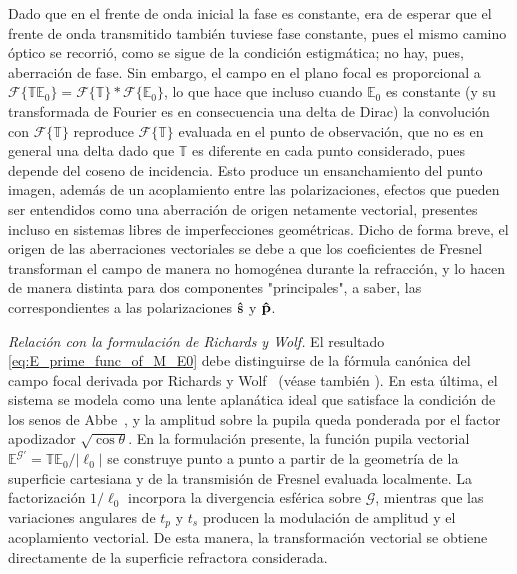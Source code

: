 Dado que en el frente de onda inicial la fase es constante, era de esperar que el frente de onda transmitido también tuviese fase constante, pues el mismo camino óptico se recorrió, como se sigue de la condición estigmática; no hay, pues, aberración de fase. Sin embargo, el campo en el plano focal es proporcional a $\mathscr F\{\mathbb T \mathbb E_0\} = \mathscr F\{\mathbb T\} * \mathscr F\{\mathbb E_0\}$, lo que hace que incluso cuando $\mathbb E_0$ es constante (y su transformada de Fourier es en consecuencia una delta de Dirac) la convolución con $\mathscr F\{\mathbb T\}$ reproduce $\mathscr F\{\mathbb T\}$ evaluada en el punto de observación, que no es en general una delta dado que $\mathbb T$ es diferente en cada punto considerado, pues depende del coseno de incidencia. Esto produce un ensanchamiento del punto imagen, además de un acoplamiento entre las polarizaciones, efectos que pueden ser entendidos como una aberración de origen netamente vectorial, presentes incluso en sistemas libres de imperfecciones geométricas. Dicho de forma breve, el origen de las aberraciones vectoriales se debe a que los coeficientes de Fresnel transforman el campo de manera no homogénea durante la refracción, y lo hacen de manera distinta para dos componentes "principales", a saber, las correspondientes a las polarizaciones $\bm{\hat{\mathbf{s}}}$ y $\bm{\hat{\mathbf{p}}}$.

\medskip

\noindent\textit{Relación con la formulación de Richards y Wolf.} El resultado
\eqref{eq:E_prime_func_of_M_E0} debe distinguirse de la fórmula canónica del
campo focal derivada por Richards y Wolf~\cite{RichardsWolf1959} (véase
también \cite{Torok1995}). En esta última, el sistema se modela como una lente
aplanática ideal que satisface la condición de los senos de
Abbe~\cite{Abbe1873}, y la amplitud sobre la pupila queda ponderada por el
factor apodizador $\sqrt{\cos\theta}$. En la formulación presente, la función
pupila vectorial
$\mathbb E^{\mathscr G'}=\mathbb T\mathbb E_0/|\ell_0|$ se construye punto a
punto a partir de la geometría de la superficie cartesiana y de la
transmisión de Fresnel evaluada localmente. La factorización $1/\ell_0$
incorpora la divergencia esférica sobre $\mathscr G$, mientras que las
variaciones angulares de $t_p$ y $t_s$ producen la modulación de amplitud y el
acoplamiento vectorial. De esta manera, la transformación vectorial se
obtiene directamente de la superficie refractora considerada.

\medskip

